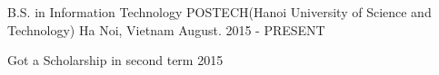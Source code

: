 


\begin{cventries}


\cventry
{B.S. in Information Technology} %
{POSTECH(Hanoi University of Science and Technology)} %
{Ha Noi, Vietnam} %
{August. 2015 - PRESENT} %
{ %
\begin{cvitems}
\item {Got a Scholarship in second term 2015}
\end{cvitems}
}


\end{cventries}
